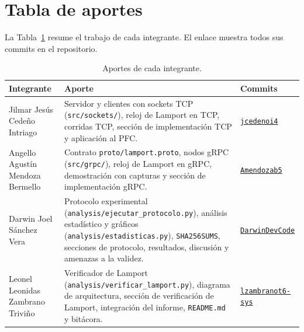 \section{Tabla de aportes}

La Tabla~\ref{tab:aportes} resume el trabajo de cada integrante. El enlace
muestra todos sus commits en el repositorio.

\begin{table}[ht]
\centering
\caption{Aportes de cada integrante.}
\label{tab:aportes}
\small
\begin{tabular}{@{}p{3.3cm}p{8.4cm}p{3.3cm}@{}}
\toprule
Integrante & Aporte & Commits \tabularnewline
\midrule
\raggedright Jilmar Jesús Cedeño Intriago &
\raggedright Servidor y clientes con sockets TCP (\texttt{src/sockets/}), reloj de Lamport
en TCP, corridas TCP, sección de implementación TCP y aplicación al PFC. &
\href{https://github.com/jcedenoi4/GA-SUM-02/commits?author=jcedenoi4}{\texttt{jcedenoi4}} \tabularnewline
\addlinespace
\raggedright Angello Agustín Mendoza Bermello &
\raggedright Contrato \texttt{proto/lamport.proto}, nodos gRPC (\texttt{src/grpc/}), reloj
de Lamport en gRPC, demostración con capturas y sección de implementación gRPC. &
\href{https://github.com/jcedenoi4/GA-SUM-02/commits?author=Amendozab5}{\texttt{Amendozab5}} \tabularnewline
\addlinespace
\raggedright Darwin Joel Sánchez Vera &
\raggedright Protocolo experimental (\texttt{analysis/ejecutar\_protocolo.py}), análisis
estadístico y gráficos (\texttt{analysis/estadisticas.py}), \texttt{SHA256SUMS},
secciones de protocolo, resultados, discusión y amenazas a la validez. &
\href{https://github.com/jcedenoi4/GA-SUM-02/commits?author=DarwinDevCode}{\texttt{DarwinDevCode}} \tabularnewline
\addlinespace
\raggedright Leonel Leonidas Zambrano Triviño &
\raggedright Verificador de Lamport (\texttt{analysis/verificar\_lamport.py}), diagrama de
arquitectura, sección de verificación de Lamport, integración del informe,
\texttt{README.md} y bitácora. &
\href{https://github.com/jcedenoi4/GA-SUM-02/commits?author=lzambranot6-sys}{\texttt{lzambranot6-sys}} \tabularnewline
\bottomrule
\end{tabular}
\end{table}
